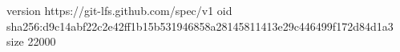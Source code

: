 version https://git-lfs.github.com/spec/v1
oid sha256:d9c14abf22c2e42ff1b15b531946858a28145811413e29c446499f172d84d1a3
size 22000

